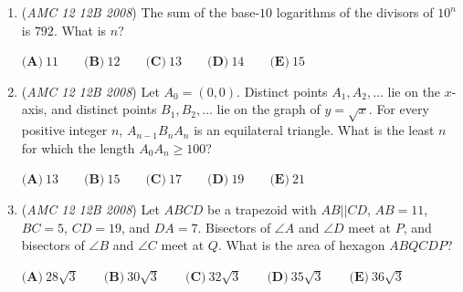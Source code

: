 \begin{enumerate}
 $\textbf{(A)} \; \frac {11}{20} \qquad \textbf{(B)} \; \frac {4}{7} \qquad \textbf{(C)} \; \frac {81}{140} \qquad \textbf{(D)} \; \frac {3}{5} \qquad \textbf{(E)} \; \frac {17}{28}$


	\item (\textit{AMC 12 12B 2008}) The sum of the base-$10$ logarithms of the divisors of $10^n$ is $792$. What is $n$?


 $\textbf{(A)}\ 11\qquad \textbf{(B)}\ 12\qquad \textbf{(C)}\ 13\qquad \textbf{(D)}\ 14\qquad \textbf{(E)}\ 15$


	\item (\textit{AMC 12 12B 2008}) Let $A_0 = (0,0)$. Distinct points $A_1,A_2,\ldots$ lie on the $x$-axis, and distinct points $B_1,B_2,\ldots$ lie on the graph of $y = \sqrt {x}$. For every positive integer $n$, $A_{n - 1}B_nA_n$ is an equilateral triangle. What is the least $n$ for which the length $A_0A_n\ge100$?


 $\textbf{(A)}\ 13\qquad \textbf{(B)}\ 15\qquad \textbf{(C)}\ 17\qquad \textbf{(D)}\ 19\qquad \textbf{(E)}\ 21$


	\item (\textit{AMC 12 12B 2008}) Let $ABCD$ be a trapezoid with $AB||CD$, $AB = 11$, $BC = 5$, $CD = 19$, and $DA = 7$. Bisectors of $\angle A$ and $\angle D$ meet at $P$, and bisectors of $\angle B$ and $\angle C$ meet at $Q$. What is the area of hexagon $ABQCDP$?


 $\textbf{(A)}\ 28\sqrt {3}\qquad \textbf{(B)}\ 30\sqrt {3}\qquad \textbf{(C)}\ 32\sqrt {3}\qquad \textbf{(D)}\ 35\sqrt {3}\qquad \textbf{(E)}\ 36\sqrt {3}$


\end{enumerate}